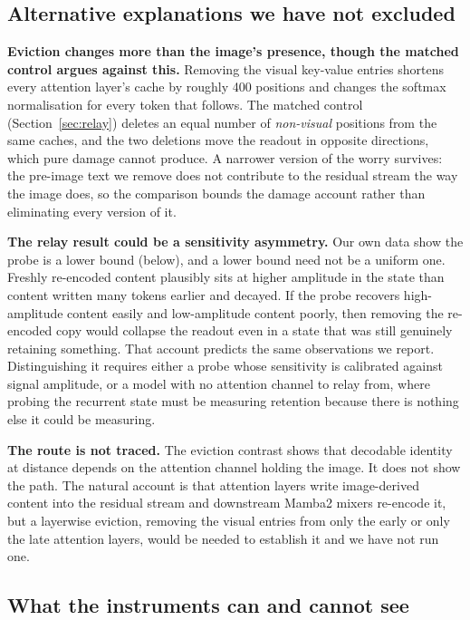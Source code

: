 \documentclass[10pt]{article}
\begin{document}
\subsection{Alternative explanations we have not excluded}

\textbf{Eviction changes more than the image's presence, though the matched
control argues against this.} Removing the visual key-value entries shortens
every attention layer's cache by roughly 400 positions and changes the
softmax normalisation for every token that follows. The matched control
(Section~\ref{sec:relay}) deletes an equal number of \emph{non-visual}
positions from the same caches, and the two deletions move the readout in
opposite directions, which pure damage cannot produce. A narrower version of
the worry survives: the pre-image text we remove does not contribute to the
residual stream the way the image does, so the comparison bounds the damage
account rather than eliminating every version of it.

\textbf{The relay result could be a sensitivity asymmetry.} Our own data show
the probe is a lower bound (below), and a lower bound need not be a uniform
one. Freshly re-encoded content plausibly sits at higher amplitude in the state
than content written many tokens earlier and decayed. If the probe recovers
high-amplitude content easily and low-amplitude content poorly, then removing
the re-encoded copy would collapse the readout even in a state that was still
genuinely retaining something. That account predicts the same observations we
report. Distinguishing it requires either a probe whose sensitivity is
calibrated against signal amplitude, or a model with no attention channel to
relay from, where probing the recurrent state must be measuring retention
because there is nothing else it could be measuring.

\textbf{The route is not traced.} The eviction contrast shows that decodable
identity at distance depends on the attention channel holding the image. It
does not show the path. The natural account is that attention layers write
image-derived content into the residual stream and downstream Mamba2 mixers
re-encode it, but a layerwise eviction, removing the visual entries from only
the early or only the late attention layers, would be needed to establish it and
we have not run one.

\subsection{What the instruments can and cannot see}
\end{document}
